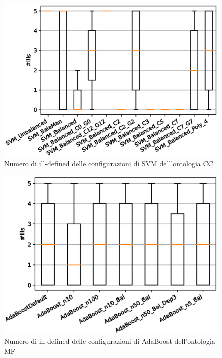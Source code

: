 \documentclass[12pt,a4paper,oneside,hidelinks]{report}
\begin{document}
\begin{figure}[hb]%
    \centering
    \includegraphics[scale = 0.80]{CC-SVM-ills.eps}%
    \caption{Numero di ill-defined delle configurazioni di SVM dell'ontologia CC}%
    \label{figure:ill12}%
\end{figure}

\vspace*{\fill}

\vspace*{\fill}

\begin{figure}[ht]%
    \centering
    \includegraphics[scale = 0.80]{MF-AdaBoost-ills.eps}%
    \caption{Numero di ill-defined delle configurazioni di AdaBoost dell'ontologia MF}
    \label{fig:ill13} 
\end{figure}
\end{document}
